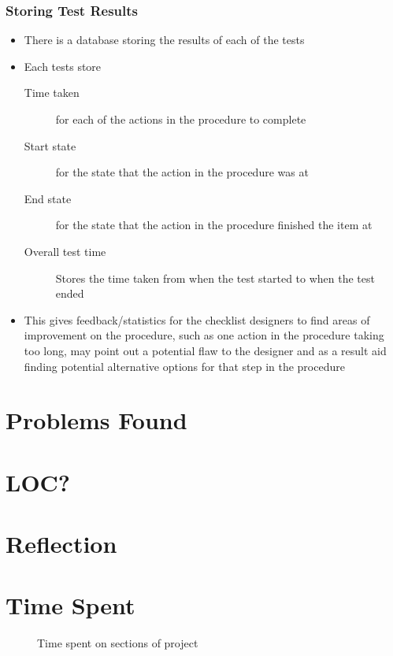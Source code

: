 \documentclass[../dissertation.tex]{subfiles}
\begin{document}
\subsubsection{Storing Test Results}
\begin{itemize}
  \item There is a database storing the results of each of the tests
  \item Each tests store
  \begin{description}
    \item[Time taken] for each of the actions in the procedure to complete
    \item[Start state] for the state that the action in the procedure was at
    \item[End state] for the state that the action in the procedure finished
      the item at
    \item[Overall test time] Stores the time taken from when the test started
      to when the test ended
  \end{description}
  \item This gives feedback/statistics for the checklist designers
    to find areas of improvement on the procedure, such as one action
    in the procedure taking too long, may point out a potential flaw
    to the designer and as a result aid finding potential alternative
    options for that step in the procedure
\end{itemize}

\section{Problems Found}


\section{LOC?}


\section{Reflection}


\section{Time Spent}
\begin{figure}[h!]
  \centering
  \caption{Time spent on sections of project}
\end{figure}
\end{document}
